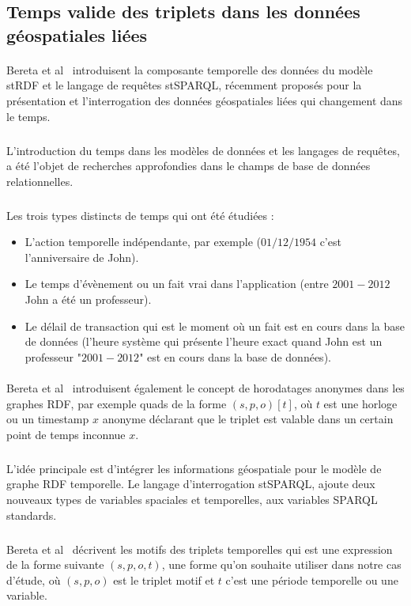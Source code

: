 \subsection*{Temps valide des triplets dans les données géospatiales liées}
\paragraph{}
Bereta et al~\cite{bereta2013} introduisent la composante temporelle des données du modèle stRDF et le langage de requêtes stSPARQL, récemment proposés pour la présentation et l’interrogation des données géospatiales liées qui changement dans le temps.
\subparagraph{}
L’introduction du temps dans les modèles de données et les langages de requêtes, a été l’objet de recherches approfondies dans le champs de base de données relationnelles.
\subparagraph{}
Les trois types distincts de temps qui ont été  étudiées :
\begin{itemize}
\item L'action temporelle indépendante, par exemple ($01/12/1954$ c’est l’anniversaire de John).
\item Le temps d’évènement ou un fait vrai dans l’application (entre $2001-2012$ John a été un professeur).
\item Le délail de transaction qui est le moment où un fait est en cours dans la base de données (l’heure système qui présente l’heure exact quand John est un professeur "$2001-2012$" est en cours dans la base de données).
\end{itemize}
\paragraph{}
Bereta et al~\cite{bereta2013} introduisent également le concept de horodatages anonymes dans les graphes RDF, par exemple quads de la forme $(s, p, o)[t]$, où $t$ est une horloge ou un timestamp $x$ anonyme déclarant que le triplet est valable dans un certain point de temps inconnue $x$.
\subparagraph{}
L’idée principale est d’intégrer les informations géospatiale pour le modèle de graphe RDF temporelle. Le langage d’interrogation stSPARQL, ajoute deux nouveaux types de variables spaciales et temporelles, aux variables SPARQL standards.
\subparagraph{}
Bereta et al~\cite{bereta2013} décrivent les motifs des triplets temporelles qui est une expression de la forme suivante $(s, p, o, t)$, une forme qu'on souhaite utiliser dans notre cas d'étude, où $(s, p, o)$ est le triplet motif et $t$ c’est une période temporelle ou une variable.
